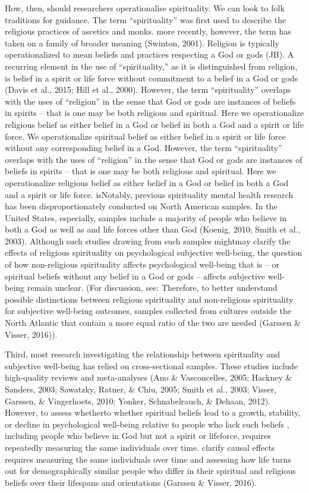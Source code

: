 \documentclass[
  english,
  man]{apa6}
\begin{document}
How, then, should researchers operationalise spirituality. We can look to folk traditions for guidance. The term \enquote{spirituality} was first used to describe the religious practices of ascetics and monks. more recently, however, the term has taken on a family of broader meaning (Swinton, 2001). Religion is typically operationalized to mean beliefs and practices respecting a God or gods (JB). A recurring element in the use of \enquote{spirituality,} as it is distinguished from religion, is belief in a spirit or life force without commitment to a belief in a God or gods (Davis et al., 2015; Hill et al., 2000). However, the term \enquote{spirituality} overlaps with the uses of \enquote{religion} in the sense that God or gods are instances of beliefs in spirits -- that is one may be both religious and spiritual. Here we operationalize religious belief as either belief in a God or belief in both a God and a spirit or life force. We operationalize spiritual belief as either belief in a spirit or life force without any corresponding belief in a God. However, the term \enquote{spirituality} overlaps with the uses of \enquote{religion} in the sense that God or gods are instances of beliefs in spirits -- that is one may be both religious and spiritual. Here we operationalize religious belief as either belief in a God or belief in both a God and a spirit or life force. isNotably, previous spirituality mental health research has been disproportionately conducted on North American samples. In the United States, especially, samples include a majority of people who believe in both a God as well as and life forces other than God (Koenig, 2010; Smith et al., 2003). Although such studies drawing from such samples mightmay clarify the effects of religious spirituality on psychological subjective well-being, the question of how non-religious spirituality affects psychological well-being that is -- or spiritual beliefs without any belief in a God or gods -- affects subjective well-being remain unclear. (For discussion, see: Therefore, to better understand possible distinctions between religious spirituality and non-religious spirituality for subjective well-being outcomes, samples collected from cultures outside the North Atlantic that contain a more equal ratio of the two are needed (Garssen \& Visser, 2016)).

Third, most research investigating the relationship between spirituality and subjective well-being has relied on cross-sectional samples. These studies include high-quality reviews and meta-analyses (Ano \& Vasconcelles, 2005; Hackney \& Sanders, 2003; Sawatzky, Ratner, \& Chiu, 2005; Smith et al., 2003; Visser, Garssen, \& Vingerhoets, 2010; Yonker, Schnabelrauch, \& Dehaan, 2012). However, to assess whetherto whether spiritual beliefs lead to a growth, stability, or decline in psychological well-being relative to people who lack such beliefs , including people who believe in God but not a spirit or lifeforce, requires repeatedly measuring the same individuals over time. clarify causal effects requires measuring the same individuals over time and assessing how life turns out for demographically similar people who differ in their spiritual and religious beliefs over their lifespans and orientations (Garssen \& Visser, 2016).
\end{document}

